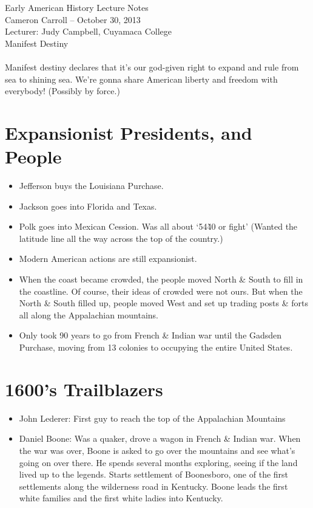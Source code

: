 \documentclass{article}
\begin{document}
\begin{center}
{\small{} Early American History Lecture Notes} \\[0.6cm]
{\small{} Cameron Carroll -- October 30, 2013} \\[0.6cm]
{\small{} Lecturer: Judy Campbell, Cuyamaca College}\\[1cm]
{\small{} Manifest Destiny}\\[1cm]
\end{center}

\tableofcontents
\newpage

\paragraph{} Manifest destiny declares that it's our god-given right to expand and rule from sea to shining sea. We're gonna share American liberty and freedom with everybody! (Possibly by force.)

\section{Expansionist Presidents, and People}
  \begin{itemize}
    \item Jefferson buys the Louisiana Purchase.
    \item Jackson goes into Florida and Texas.
    \item Polk goes into Mexican Cession. Was all about `54\`40 or fight' (Wanted the latitude line all the way across the top of the country.)
    \item Modern American actions are still expansionist.
    \item When the coast became crowded, the people moved North \& South to fill in the coastline. Of course, their ideas of crowded were not ours. But when the North \& South filled up, people moved West and set up trading posts \& forts all along the Appalachian mountains.
    \item Only took 90 years to go from French \& Indian war until the Gadsden Purchase, moving from 13 colonies to occupying the entire United States.
  \end{itemize}

\section{1600's Trailblazers}
  \begin{itemize}
    \item John Lederer: First guy to reach the top of the Appalachian Mountains
    \item Daniel Boone: Was a quaker, drove a wagon in French \& Indian war. When the war was over, Boone is asked to go over the mountains and see what's going on over there. He spends several months exploring, seeing if the land lived up to the legends. Starts settlement of Boonesboro, one of the first settlements along the wilderness road in Kentucky. Boone leads the first white families and the first white ladies into Kentucky. 
  \end{itemize}
\end{document}
